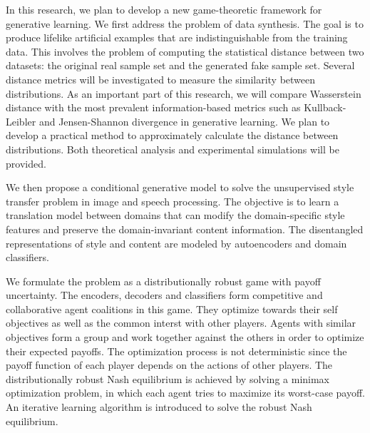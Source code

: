 \documentclass{article}
\begin{document}
In this research, we plan to develop a new game-theoretic framework for generative learning. We first address the problem of data synthesis. The goal is to produce lifelike artificial examples that are indistinguishable from the training data. This involves the problem of computing the statistical distance between two datasets: the original real sample set and the generated fake sample set. Several distance metrics will be investigated to measure the similarity between distributions. As an important part of this research, we will compare Wasserstein distance \cite{Villani} with the most prevalent information-based metrics such as Kullback-Leibler \cite{kullback_1978} and Jensen-Shannon divergence \cite{1365067} in generative learning. We plan to develop a practical method to approximately calculate the distance between distributions. Both theoretical analysis and experimental simulations will be provided. %

We then propose a conditional generative model to solve the unsupervised style transfer problem in image and speech processing. The objective is to learn a translation model between domains that can modify the domain-specific style features and preserve the domain-invariant content information. The disentangled representations of style and content are modeled by autoencoders and domain classifiers.

We formulate the problem as a distributionally robust game with payoff uncertainty. The encoders, decoders and classifiers form competitive and collaborative agent coalitions in this game. They optimize towards their self objectives as well as the common interst with other players. Agents with similar objectives form a group and work together against the others in order to optimize their expected payoffs. The optimization process is not deterministic since the payoff function of each player depends on the actions of other players. The distributionally robust Nash equilibrium is achieved by solving a minimax optimization problem, in which each agent tries to maximize its worst-case payoff. An iterative learning algorithm is introduced to solve the robust Nash equilibrium.
\end{document}
